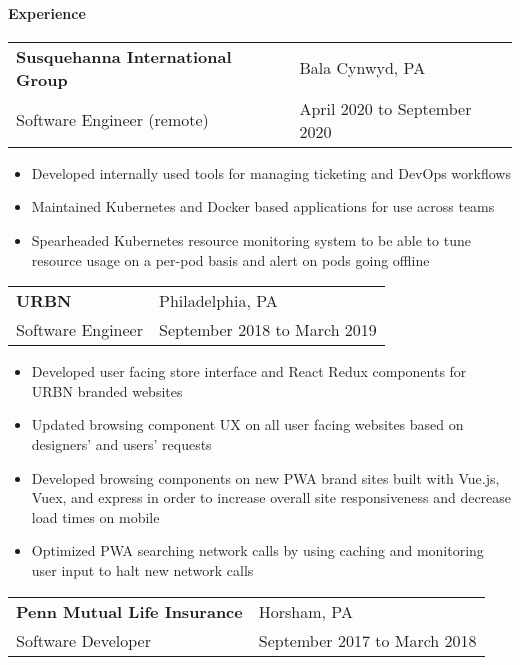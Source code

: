 \documentclass[9pt,]{article}
\let\oldparagraph\paragraph
\renewcommand{\paragraph}[1]{\oldparagraph{#1}\mbox{}}
\begin{document}
\hypertarget{experience}{%
\paragraph{Experience}\label{experience}}

\begin{tabularx}{\textwidth}{l X}
    \textbf{Susquehanna International Group} & \hfill Bala Cynwyd, PA \\
    Software Engineer (remote)       & \hfill April 2020 to September 2020
\end{tabularx}

\begin{itemize}
	\setlength\itemsep{-0.75em}
    \item Developed internally used tools for managing ticketing and DevOps workflows
    \item Maintained Kubernetes and Docker based applications for use across teams
    \item Spearheaded Kubernetes resource monitoring system to be able to tune resource usage on a per-pod basis and alert on pods going offline
\end{itemize}

\begin{tabularx}{\textwidth}{l X}
    \textbf{URBN} & \hfill Philadelphia, PA\\
    Software Engineer        & \hfill September 2018 to March 2019
\end{tabularx}

\begin{itemize}
	\setlength\itemsep{-0.75em}
    \item Developed user facing store interface and React Redux components for URBN branded websites
    \item Updated browsing component UX on all user facing websites based on designers' and users' requests
    \item Developed browsing components on new PWA brand sites built with Vue.js, Vuex, and express in order to increase overall site responsiveness and decrease load times on mobile
    \item Optimized PWA searching network calls by using caching and monitoring user input to halt new network calls
\end{itemize}

\begin{tabularx}{\textwidth}{l X}
    \textbf{Penn Mutual Life Insurance} & \hfill Horsham, PA\\
    Software Developer          & \hfill September 2017 to March 2018
\end{tabularx}
\end{document}
